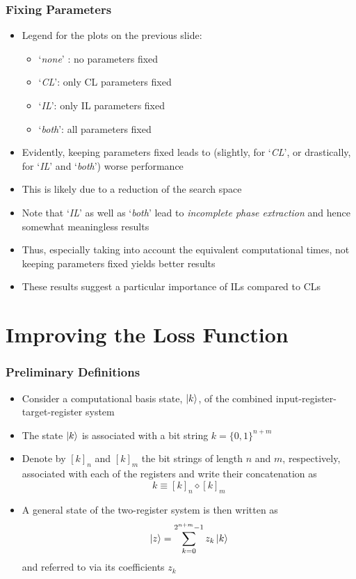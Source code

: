 \documentclass{beamer}
\begin{document}
\begin{frame}
\frametitle{Fixing Parameters}
\begin{itemize}
\item Legend for the plots on the previous slide:
\begin{itemize}
\item `\emph{none}' : no parameters fixed 
\item `\emph{CL}': only CL parameters fixed
\item `\emph{IL}': only IL parameters fixed 
\item `\emph{both}': all parameters fixed  
\end{itemize} 
\item Evidently, keeping parameters fixed leads to (slightly, for `\emph{CL}', or drastically, for `\emph{IL}' and `\emph{both}') \alert{worse performance} 
\item This is likely due to a reduction of the search space 
\item Note that `\emph{IL}' as well as `\emph{both}' lead to \alert{\emph{incomplete phase extraction}} and hence somewhat meaningless results 
\item Thus, especially taking into account the equivalent computational times, \alert{not keeping parameters fixed yields better results} 
\item These results suggest a particular importance of ILs compared to CLs 
\end{itemize}
\end{frame}

\section{Improving the Loss Function}

\begin{frame}
\frametitle{Preliminary Definitions}
\begin{itemize}
\item Consider a computational basis state, $\ket{k}$, of the \alert{combined} input-register-target-register \alert{system} 
\item The state $\ket{k}$ is associated with a \alert{bit string} $k = \{0,1 \}^{n+m}$
\item Denote by $[k]_n$ and $[k]_m$ the bit strings of length $n$ and $m$, respectively, associated with each of the registers and write their \alert{concatenation} as 
\begin{equation}
k \equiv [k]_n \diamond [k]_m
\end{equation} 
\item A general state of the two-register system is then written as 
\begin{equation}
\ket{z} = \sum^{2^{n+m}-1}_{k=0} z_k \ket{k}
\end{equation}
and referred to via its \alert{coefficients} $z_k$
\end{itemize}
\end{frame}
\end{document}
